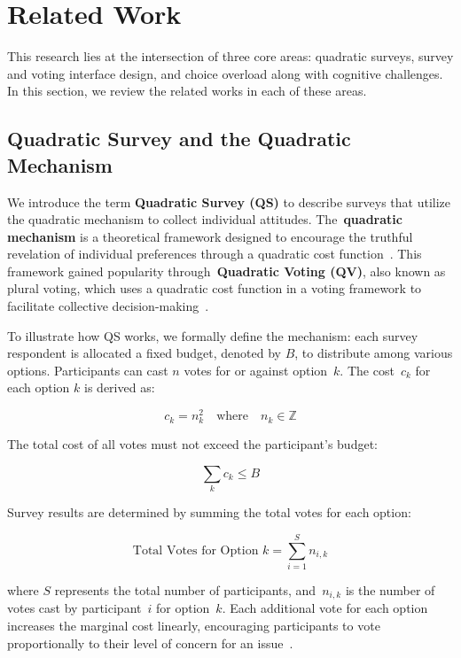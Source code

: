 \section{Related Work}
\label{sec:relatedWorks}
This research lies at the intersection of three core areas: quadratic surveys, survey and voting interface design, and choice overload along with cognitive challenges. In this section, we review the related works in each of these areas.

\subsection{Quadratic Survey and the Quadratic Mechanism}
We introduce the term \textbf{Quadratic Survey (QS)} to describe surveys that utilize the quadratic mechanism to collect individual attitudes. The~\textbf{quadratic mechanism} is a theoretical framework designed to encourage the truthful revelation of individual preferences through a quadratic cost function~\cite{grovesOptimalAllocationPublic1977}. This framework gained popularity through~\textbf{Quadratic Voting (QV)}, also known as plural voting, which uses a quadratic cost function in a voting framework to facilitate collective decision-making~\cite{lalley2016quadratic}.%

To illustrate how QS works, we formally define the mechanism: each survey respondent is allocated a fixed budget, denoted by $B$, to distribute among various options. Participants can cast $n$ votes for or against option~$k$. The cost~$c_k$ for each option $k$ is derived as:

\[c_k = n_k^2 \quad \text{where}\quad n_k \in \mathbb{Z}\]

The total cost of all votes must not exceed the participant's budget:

\[\sum_k c_k \leq B\]

Survey results are determined by summing the total votes for each option:

\[ \text{Total Votes for Option } k = \sum_{i=1}^{S} n_{i,k} \]

where $S$ represents the total number of participants, and~$n_{i,k}$ is the number of votes cast by participant~$i$ for option~$k$. Each additional vote for each option increases the marginal cost linearly, encouraging participants to vote proportionally to their level of concern for an issue~\cite{posner2018radical}.

